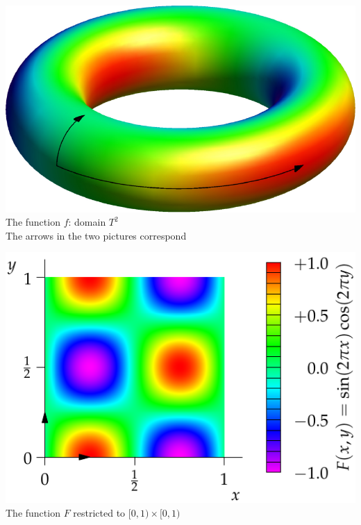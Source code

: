 
\begin{center}
	\begin{minipage}{0.45\textwidth}\centering
		\includegraphics[width=\textwidth]{relations-14-torus}\\[14pt]
		The function $f$: domain $T^2$\\
		The arrows in the two pictures correspond
	\end{minipage}\qquad
	\begin{minipage}{0.45\textwidth}\centering
		\includegraphics[width=\textwidth]{relations-14-torus2}\\
		The function $F$ restricted to $[0,1)\times [0,1)$
	\end{minipage}
\end{center}

